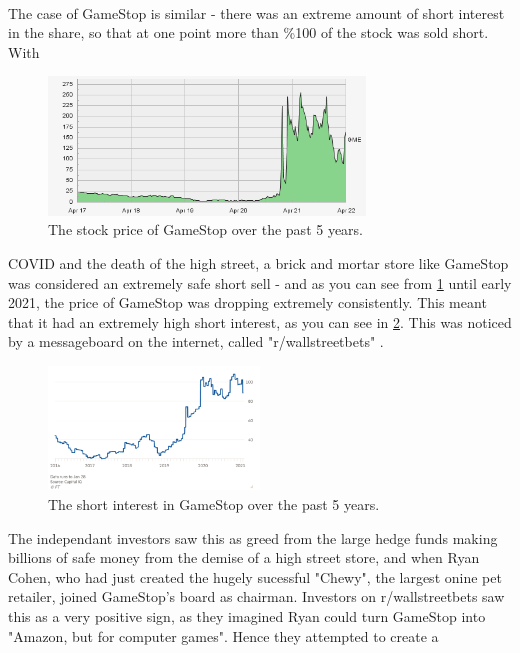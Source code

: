 \documentclass[11pt]{article} %
\begin{document}
\paragraph{}
The case of GameStop is similar - there was an extreme amount of short interest in 
the share, so that at one point more than \%100 of the stock was sold short. With 
\begin{figure}[h]
    \centering
    \includegraphics[width=0.75\textwidth]{gamestopprice.png}
    \caption{The stock price of GameStop over the past 5 years.}\label{gamestopprice}
    \end{figure}
    COVID and the death of the high street, a brick and mortar store like GameStop was 
considered an extremely safe short sell - and as you can see from \ref{gamestopprice}  
until early 2021, the price of GameStop was dropping extremely consistently. This  
meant that it had an extremely high short interest, as you can see in \ref{shortinterest}. 
This was noticed by a messageboard on the internet, called "r/wallstreetbets" \cite{wsb}. 
\begin{figure}[h]
    \centering
    \includegraphics[width=0.5\textwidth]{shortinterest.png}
    \caption{The short interest in GameStop over the past 5 years.}
    \label{shortinterest}
    \end{figure}
The independant investors saw 
this as greed from the large hedge funds making billions of safe money from the demise 
of a high street store, and when Ryan Cohen, who had just created the hugely sucessful 
"Chewy", the largest onine pet retailer, joined GameStop's board as chairman. Investors
on r/wallstreetbets saw this as a very positive sign, as they imagined Ryan could turn 
GameStop into "Amazon, but for computer games". Hence they attempted to create a 
\end{document}
